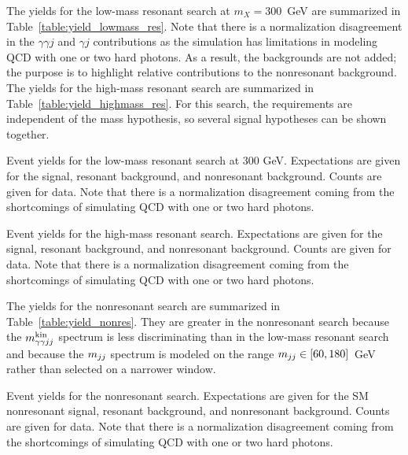 The yields for the low-mass resonant search at $m_X = 300$~GeV are summarized in
Table~\ref{table:yield_lowmass_res}. Note that there is a normalization disagreement in the
$\gamma\gamma j$ and $\gamma j$ contributions as the simulation has limitations in modeling
QCD with one or two hard photons. As a result, the backgrounds are not added; the purpose is to
highlight relative contributions to the nonresonant background.
The yields for the high-mass resonant search are summarized in
Table~\ref{table:yield_highmass_res}. For this search, the requirements are independent of
the mass hypothesis, so several signal hypotheses can be shown together.

\begin{table}[ht!]
  \centering
  \renewcommand{\arraystretch}{1.4}
  \caption{Event yields for the low-mass resonant search at 300 GeV. Expectations are given for
the signal, resonant background, and nonresonant background. Counts are given for data. Note that
there is a normalization disagreement coming from the shortcomings of simulating QCD with one
or two hard photons.}
  
  \label{table:yield_lowmass_res}
\end{table}

\begin{table}[ht!]
  \centering
  \renewcommand{\arraystretch}{1.4}
  \caption{Event yields for the high-mass resonant search. Expectations are given for
the signal, resonant background, and nonresonant background. Counts are given for data. Note that
there is a normalization disagreement coming from the shortcomings of simulating QCD with one
or two hard photons.}
  
  \label{table:yield_highmass_res}
\end{table}

The yields for the nonresonant search are summarized in Table~\ref{table:yield_nonres}.
They are greater in the nonresonant search because the $m_{\gamma\gamma jj}^{\rm kin}$ spectrum is less
discriminating than in the low-mass resonant search and because the $m_{jj}$ spectrum is
modeled on the range $m_{jj} \in [60,180]$~GeV rather than selected on a narrower window.

\begin{table}[ht!]
  \centering
  \renewcommand{\arraystretch}{1.4}
  \caption{Event yields for the nonresonant search. Expectations are given for
the SM nonresonant signal, resonant background, and nonresonant background.
Counts are given for data. Note that
there is a normalization disagreement coming from the shortcomings of simulating QCD with one
or two hard photons.}
  
  \label{table:yield_nonres}
\end{table}

